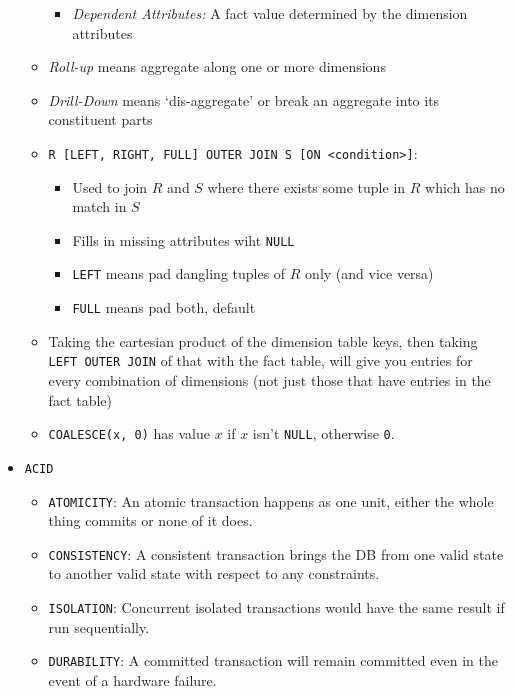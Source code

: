 \documentclass[landscape,8pt]{extarticle}
\newcommand{\code}{\lstinline}
\begin{document}
\begin{multicols}{4}
\begin{itemize}
\begin{itemize}
\begin{itemize}
            \item \emph{Dependent Attributes:} A fact value determined by the dimension attributes
        \end{itemize}
        \item \emph{Roll-up} means aggregate along one or more dimensions
        \item \emph{Drill-Down} means `dis-aggregate' or break an aggregate into its constituent parts
    \item \code{R [LEFT, RIGHT, FULL] OUTER JOIN S [ON <condition>]}: 
    \begin{itemize}
        \item Used to join $R$ and $S$ where there exists some tuple in $R$ which has no match in
        $S$
        \item Fills in missing attributes wiht \code{NULL}
        \item \code{LEFT} means pad dangling tuples of $R$ only (and vice versa)
        \item \code{FULL} means pad both, default
    \end{itemize}
    \item Taking the cartesian product of the dimension table keys, then taking 
    \code{LEFT OUTER JOIN} of that with the fact table, will give you entries for every combination of dimensions
    (not just those that have entries in the fact table)
    \item \code{COALESCE(x, 0)} has value $x$ if $x$ isn't \code{NULL}, otherwise \code{0}.
    \end{itemize}
    \item \code{ACID}
    \begin{itemize}
        \item \code{ATOMICITY}: An atomic transaction happens as one unit, either the whole thing
        commits or none of it does.
        \item \code{CONSISTENCY}: A consistent transaction brings the DB from one valid state to
        another valid state with respect to any constraints.
        \item \code{ISOLATION}: Concurrent isolated transactions would have the same result if run sequentially.
        \item \code{DURABILITY}: A committed transaction will remain committed even in the event of
        a hardware failure.
    \end{itemize}
\end{itemize}
\begin{center}

\end{center}
\end{multicols}
\end{document}
